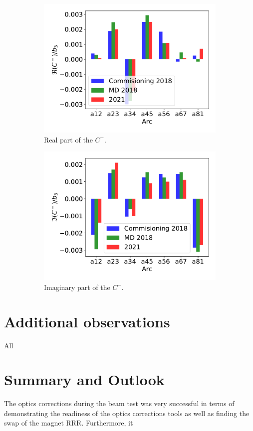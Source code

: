 \documentclass[a4paper]{cernatsnote}
\begin{document}
\begin{figure}[ht]
\begin{subfigure}{.5\textwidth}
  \centering
  \includegraphics[width=.8\linewidth]{plots/MCS/b2_change_re_per_b3.pdf}  
  \caption{Real part of the $C^-$.}
  \label{fig:sub-first}
\end{subfigure}
\begin{subfigure}{.5\textwidth}
  \centering
  \includegraphics[width=.8\linewidth]{plots/MCS/b_2change_im_per_b3.pdf}  
  \caption{Imaginary part of the $C^-$.}
  \label{fig:sub-second}
\end{subfigure}
\caption{}
\label{fig:fig}
\end{figure}

\section{Additional observations}
All

\section{Summary and Outlook}
The optics corrections during the beam test was very successful in terms of demonstrating the readiness of the optics corrections tools as well as finding the swap of the magnet RRR. Furthermore, it 
\end{document}
